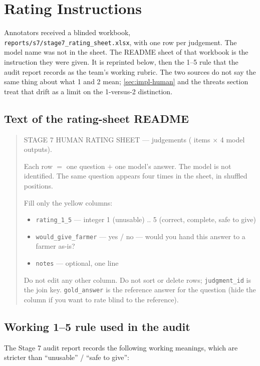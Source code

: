 \chapter{Rating Instructions}
\label{app:D}
\label{app:rubric}

Annotators received a blinded workbook, \texttt{reports/s7/stage7\_rating\_sheet.xlsx}, with one row per judgement. The model name was not in the sheet. The README sheet of that workbook is the instruction they were given. It is reprinted below, then the 1--5 rule that the audit report records as the team's working rubric. The two sources do not say the same thing about what 1 and 2 mean; \cref{sec:impl-human} and the threats section treat that drift as a limit on the 1-versus-2 distinction.

\section*{Text of the rating-sheet README}

\begin{quote}
\footnotesize
STAGE 7 HUMAN RATING SHEET --- \HumUniqueOutputs{} judgements (\HumQuestions{} items $\times$ 4 model outputs).

Each row $=$ one question $+$ one model's answer. The model is not identified. The same question appears four times in the sheet, in shuffled positions.

Fill only the yellow columns:
\begin{itemize}[leftmargin=1.4em]
  \item \texttt{rating\_1\_5} --- integer 1 (unusable) .. 5 (correct, complete, safe to give)
  \item \texttt{would\_give\_farmer} --- yes / no --- would you hand this answer to a farmer as-is?
  \item \texttt{notes} --- optional, one line
\end{itemize}
Do not edit any other column. Do not sort or delete rows; \texttt{judgment\_id} is the join key. \texttt{gold\_answer} is the reference answer for the question (hide the column if you want to rate blind to the reference).
\end{quote}

\section*{Working 1--5 rule used in the audit}

The Stage 7 audit report records the following working meanings, which are stricter than ``unusable'' / ``safe to give'':

